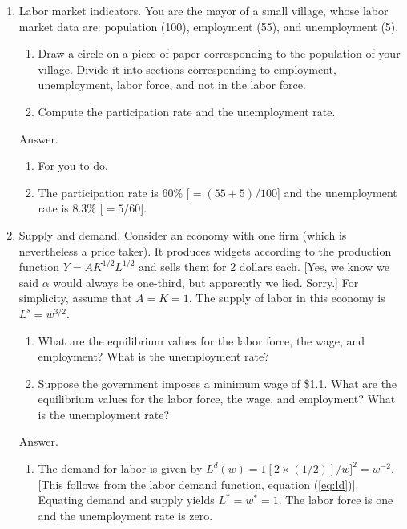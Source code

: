 \documentclass[letterpaper,12pt]{article}
\begin{document}
\begin{enumerate}

\item Labor market indicators.
You are the mayor of a small village, whose
labor market data are: population (100), employment (55), and
unemployment (5).
\begin{enumerate}
\item Draw a circle on a piece of paper corresponding to the
population of your village. Divide it into sections corresponding
to employment, unemployment, labor force, and not in the labor
force.

\item Compute the participation rate and the unemployment rate.
\end{enumerate}

Answer.
\begin{enumerate}
\item For you to do.

\item The participation rate is 60\% [$= (55+5)/100$] and the
unemployment rate is 8.3\% [$= 5/60$].
\end{enumerate}

\item Supply and demand. Consider an economy with one firm (which
is nevertheless a price taker).  It produces widgets according to
the production function $Y = A K^{1/2}L^{1/2}$ and sells them for
2 dollars each.
[Yes, we know we said $\alpha$ would always be one-third,
but apparently we lied.  Sorry.]
For simplicity, assume that $A = K = 1$.  The
supply of labor in this economy is $L^{s}=w^{3/2}$.
%
\begin{enumerate}
\item What are the equilibrium values for the labor force, the
wage, and employment? What is the unemployment rate?

\item Suppose the government imposes a minimum wage of \$1.1. What
are the equilibrium values for the labor force, the wage, and
employment? What is the unemployment rate?
\end{enumerate}

Answer.
%
\begin{enumerate}
\item The demand for labor is given by $L^{d}(w) = 1 [ 2 \times
(1/2)]/{w}]^{2} = w^{-2}$.  [This follows from the labor demand
function, equation (\ref{eq:ld})].  Equating demand and supply
yields $L^{*}=w^{*}=1$. The labor force is one and the
unemployment rate is zero.


\end{enumerate}
\end{enumerate}
\end{document}
